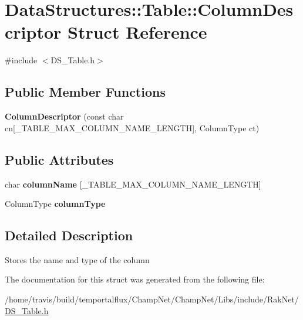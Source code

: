 \hypertarget{struct_data_structures_1_1_table_1_1_column_descriptor}{\section{Data\-Structures\-:\-:Table\-:\-:Column\-Descriptor Struct Reference}
\label{struct_data_structures_1_1_table_1_1_column_descriptor}
}


{\ttfamily \#include $<$D\-S\-\_\-\-Table.\-h$>$}

\subsection*{Public Member Functions}
\begin{DoxyCompactItemize}
\item 
\hypertarget{struct_data_structures_1_1_table_1_1_column_descriptor_a5ebf0d4b1e5286488e4d6a3422ec8e23}{{\bfseries Column\-Descriptor} (const char cn\mbox{[}\-\_\-\-T\-A\-B\-L\-E\-\_\-\-M\-A\-X\-\_\-\-C\-O\-L\-U\-M\-N\-\_\-\-N\-A\-M\-E\-\_\-\-L\-E\-N\-G\-T\-H\mbox{]}, Column\-Type ct)}\label{struct_data_structures_1_1_table_1_1_column_descriptor_a5ebf0d4b1e5286488e4d6a3422ec8e23}

\end{DoxyCompactItemize}
\subsection*{Public Attributes}
\begin{DoxyCompactItemize}
\item 
\hypertarget{struct_data_structures_1_1_table_1_1_column_descriptor_a6e4593dbcf2f0daef8eb3a9394f2860f}{char {\bfseries column\-Name} \mbox{[}\-\_\-\-T\-A\-B\-L\-E\-\_\-\-M\-A\-X\-\_\-\-C\-O\-L\-U\-M\-N\-\_\-\-N\-A\-M\-E\-\_\-\-L\-E\-N\-G\-T\-H\mbox{]}}\label{struct_data_structures_1_1_table_1_1_column_descriptor_a6e4593dbcf2f0daef8eb3a9394f2860f}

\item 
\hypertarget{struct_data_structures_1_1_table_1_1_column_descriptor_abaaf992b379cf622de7494e26bf23f66}{Column\-Type {\bfseries column\-Type}}\label{struct_data_structures_1_1_table_1_1_column_descriptor_abaaf992b379cf622de7494e26bf23f66}

\end{DoxyCompactItemize}


\subsection{Detailed Description}
Stores the name and type of the column 

The documentation for this struct was generated from the following file\-:\begin{DoxyCompactItemize}
\item 
/home/travis/build/temportalflux/\-Champ\-Net/\-Champ\-Net/\-Libs/include/\-Rak\-Net/\hyperlink{_d_s___table_8h}{D\-S\-\_\-\-Table.\-h}\end{DoxyCompactItemize}
